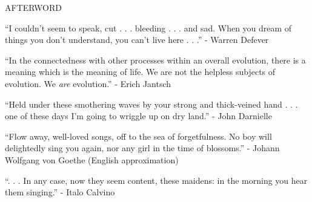 \documentclass[12pt]{article}
\begin{document}
\begingroup
\begin{center}
\huge
\end{center}
\endgroup

\begingroup
\begin{center}
\huge AFTERWORD
\end{center}
\endgroup

\vspace*{2\baselineskip}

\begingroup
\begin{center}
``I couldn't seem to speak, cut . . . bleeding . . . and sad. When you dream of things you don't understand, you can't live here . . .''
\rightskip\leftskip
\phantom{text} \hfill - Warren Defever
\end{center}
\endgroup

\vspace*{2\baselineskip}

\begingroup
\begin{center}
``In the connectedness with other processes within an overall evolution, there is a meaning which is the meaning of life. We are not the helpless subjects of evolution. We  \textit{are} evolution.'' 
\rightskip\leftskip
\phantom{text} \hfill - Erich Jantsch
\end{center}
\endgroup

\vspace*{2\baselineskip}

\begingroup
\begin{center}
``Held under these smothering waves by your strong and thick-veined hand . . . one of these days I'm going to wriggle up on dry land.''
\rightskip\leftskip
\phantom{text} \hfill - John Darnielle
\end{center}
\endgroup

\vspace*{2\baselineskip}

\begingroup
\begin{center}
``Flow away, well-loved songs, off to the sea of forgetfulness. No boy will delightedly sing you again, nor any girl in the time of blossoms.''
\rightskip\leftskip
\phantom{text} \hfill - Johann Wolfgang von Goethe (English approximation)
\end{center}
\endgroup

\vspace*{2\baselineskip}

\begingroup
\begin{center}
``. . . In any case, now they seem content, these maidens: in the morning you hear them singing.''
\rightskip\leftskip
\phantom{text} \hfill - Italo Calvino
\end{center}
\endgroup
\end{document}
